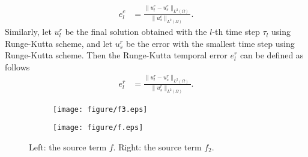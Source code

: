 \documentclass[preprint,12pt]{elsarticle}
\begin{document}
\begin{equation}\label{err2}
\begin{aligned}
e^{c}_{l}&=\frac{\|u^{c}_{l}-u^{c}_{s}\|_{L^2(\Omega)}}{\|u^{c}_{s}\|_{L^2(\Omega)}}.
\end{aligned}
\end{equation}
Similarly, let $u^{r}_{l}$ be the final solution obtained with the $l$-th time step $\tau_l$ using Runge-Kutta scheme, and let $u^{r}_{s}$ be the error with the smallest time step using Runge-Kutta scheme. Then the Runge-Kutta temporal error $e^{r}_l$ can be defined as follows
\begin{equation}\label{err22}
\begin{aligned}
e^{r}_l&=\frac{\|u^{r}_{l}-u^{r}_{s}\|_{L^2(\Omega)}}{\|u^{r}_{s}\|_{L^2(\Omega)}}.
\end{aligned}
\end{equation}


 \begin{figure}[H]
    \centering
    \begin{subfigure}{0.42\textwidth}
        \texttt{[image: figure/f3.eps]}
        \caption{}
        \label{fig:C31}
    \end{subfigure}
    \begin{subfigure}{0.42\textwidth}
        \texttt{[image: figure/f.eps]}
        \caption{}
        \label{fig:C32}
    \end{subfigure}
    \caption{Left: the source term $f$. Right: the source term $f_2$.}
    \label{fig:C3}
\end{figure}
\end{document}

